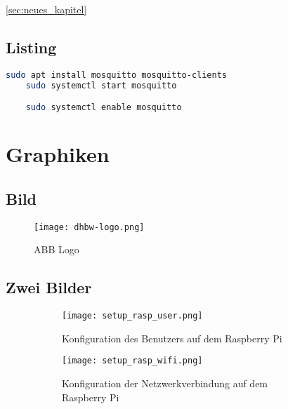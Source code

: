 \autoref{sec:neues_kapitel}                     %

\section{Listing}
\begin{lstlisting}[language=bash,caption={Installation und starten von Mosquitto auf dem Raspberry Pi},label={lst:inst_mosq}]
    sudo apt install mosquitto mosquitto-clients
    sudo systemctl start mosquitto

    sudo systemctl enable mosquitto
\end{lstlisting}

\chapter{Graphiken}

\section{Bild}
\begin{figure}[H]                               %
    \center
    \texttt{[image: dhbw-logo.png]}
    \caption{ABB Logo} \cite[58]{SBCs}
    \label{fig:abb_logo}
\end{figure}


\section{Zwei Bilder}
\begin{figure}[H]                                   %
    \centering
    \begin{subfigure}[b]{0.44\textwidth}
        \centering
        \texttt{[image: setup\_rasp\_user.png]}
        \caption{Konfiguration des Benutzers auf dem Raspberry Pi} 
        \label{fig:setup_rasp_user}
    \end{subfigure}
    \hfill
    \begin{subfigure}[b]{0.44\textwidth}
        \centering
        \texttt{[image: setup\_rasp\_wifi.png]}
        \caption{Konfiguration der Netzwerkverbindung auf dem Raspberry Pi}
        \label{fig:setup_rasp_wifi}
    \end{subfigure}
    \caption*{\cite{ultraschallsensor_p&f}}
\end{figure}


